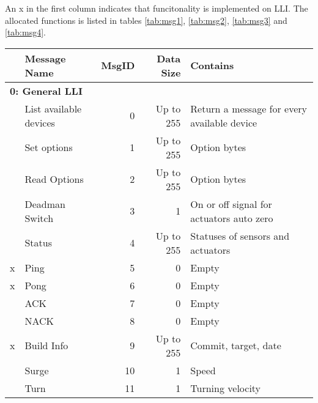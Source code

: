 An x in the first column indicates that funcitonality is implemented on \ac{LLI}. The allocated functions is listed in tables \vref{tab:msg1}, \vref{tab:msg2}, \vref{tab:msg3} and \vref{tab:msg4}.

\begin{sidewaystable}[h]
\centering
	\begin{tabular}{llrrl}
	\toprule
	& \textbf{Message Name} & \textbf{MsgID} & \textbf{Data Size} & \textbf{Contains}\\
	\midrule
	\multicolumn{5}{l}{\textbf{0: General LLI	}}\\
	\midrule
	& List available devices & 0 & Up to 255 & Return a message for every available device\\
	& Set options & 1 & Up to 255 & Option bytes\\
	& Read Options & 2 & Up to 255 & Option bytes\\
	& Deadman Switch & 3 & 1 & On or off signal for actuators auto zero \\
	& Status & 4 & Up to 255 & Statuses of sensors and actuators \\
	x& Ping & 5 & 0 & Empty \\
	x& Pong & 6 & 0 & Empty \\
	& ACK & 7 & 0 & Empty \\
	& NACK & 8 & 0 & Empty \\
	x& Build Info & 9 & Up to 255 & Commit, target, date\\
	& Surge & 10 & 1 & Speed\\
	& Turn & 11 & 1 & Turning velocity\\
	\bottomrule
	\end{tabular}
\caption{}
\label{tab:msg1}
\end{sidewaystable}
\newpage


